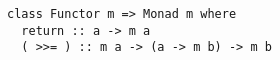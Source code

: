 \begin{algorithm}

\begin{verbatim}
class Functor m => Monad m where
  return :: a -> m a
  ( >>= ) :: m a -> (a -> m b) -> m b
\end{verbatim}

\caption{Monad type class in Haskell. %
\label{monad:haskell}}
\end{algorithm}
